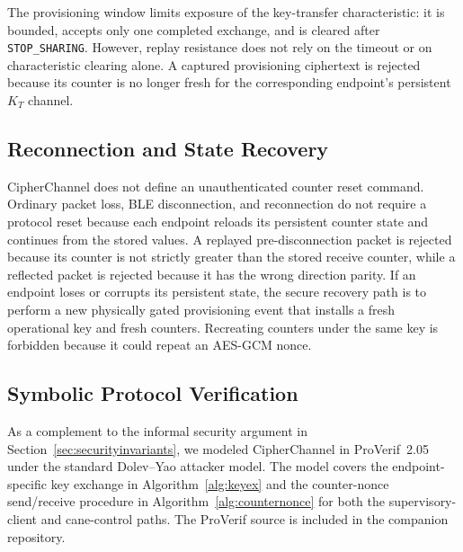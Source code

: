 \documentclass[journal]{IEEEtran}
\begin{document}
The provisioning window limits exposure of the key-transfer characteristic: it is bounded, accepts only one completed exchange, and is cleared after \texttt{STOP\_SHARING}. However, replay resistance does not rely on the timeout or on characteristic clearing alone. A captured provisioning ciphertext is rejected because its counter is no longer fresh for the corresponding endpoint's persistent \(K_T\) channel.
\subsection{Reconnection and State Recovery}
\label{sec:reset}
CipherChannel does not define an unauthenticated counter reset command. Ordinary packet loss, BLE disconnection, and reconnection do not require a protocol reset because each endpoint reloads its persistent counter state and continues from the stored values. A replayed pre-disconnection packet is rejected because its counter is not strictly greater than the stored receive counter, while a reflected packet is rejected because it has the wrong direction parity. If an endpoint loses or corrupts its persistent state, the secure recovery path is to perform a new physically gated provisioning event that installs a fresh operational key and fresh counters. Recreating counters under the same key is forbidden because it could repeat an AES-GCM nonce.

\subsection{Symbolic Protocol Verification}
\label{sec:formalverif}

As a complement to the informal security argument in Section~\ref{sec:securityinvariants}, we modeled CipherChannel in ProVerif~2.05~\cite{blanchet2016proverif} under the standard Dolev--Yao attacker model. The model covers the endpoint-specific key exchange in Algorithm~\ref{alg:keyex} and the counter-nonce send/receive procedure in Algorithm~\ref{alg:counternonce} for both the supervisory-client and cane-control paths. The ProVerif source is included in the companion repository.
\end{document}
